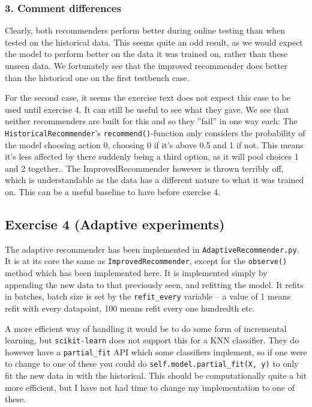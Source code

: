 \documentclass[a4paper]{article}
\begin{document}

 
\subsubsection*{3. Comment differences}
Clearly, both recommenders perform better during online testing than when tested on the historical
data. This seems quite an odd result, as we would expect the model to perform better on the data
it was trained on, rather than these unseen data. We fortunately see that the improved recommender
does better than the historical one on the first testbench case.

For the second case, it seems the exercise text does not expect this case to be used until exercise 4.
It can still be useful to see what they gave. We see that neither recommenders are built for this and so
they ''fail'' in one way each: The \texttt{HistoricalRecommender}'s \texttt{recommend()}-function only
considers the probability of the model choosing action 0, choosing 0 if it's above 0.5 and 1 if not.
This means it's less affected by there suddenly being a third option, as it will pool choices 1 and 2
together.. The ImprovedRecommender however is thrown terribly off, which is understandable as the data
has a different nature to what it was trained on. This can be a useful baseline to have before exercise
4.

\subsection*{Exercise 4 (Adaptive experiments)}
The adaptive recommender has been implemented in \texttt{AdaptiveRecommender.py}. It is
at its core the same as \texttt{ImprovedRecommender}, except for the \texttt{observe()} method which has
been implemented here. It is implemented simply by appending the new data to that previously seen, and
refitting the model. It refits in batches, batch size is set by the \texttt{refit\_every} variable
-- a value of 1 means refit with every datapoint, 100 means refit every one hundredth etc.

A more efficient way of handling it would be to do some form of incremental learning, but
\texttt{scikit-learn} does not support this for a KNN classifier. They do however have a
\texttt{partial\_fit} API which some classifiers implement, so if one were to change to one of these you
could do \texttt{self.model.partial\_fit(X, y)} to only fit the new data in with the historical. This
should be computationally quite a bit more efficient, but I have not had time to change my
implementation to one of these.
\end{document}
